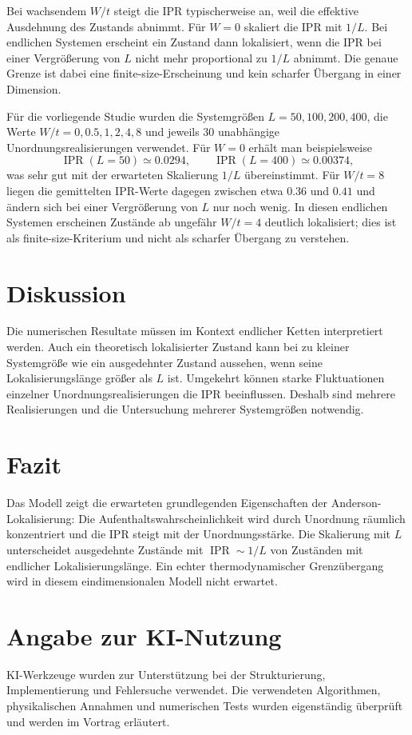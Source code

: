 \documentclass[11pt,a4paper]{article}
\begin{document}
Bei wachsendem $W/t$ steigt die IPR typischerweise an, weil die effektive
Ausdehnung des Zustands abnimmt. Für $W=0$ skaliert die IPR mit $1/L$.
Bei endlichen Systemen erscheint ein Zustand dann lokalisiert, wenn die IPR
bei einer Vergrößerung von $L$ nicht mehr proportional zu $1/L$ abnimmt.
Die genaue Grenze ist dabei eine finite-size-Erscheinung und kein scharfer
Übergang in einer Dimension.

Für die vorliegende Studie wurden die Systemgrößen $L=50,100,200,400$,
die Werte $W/t=0,0.5,1,2,4,8$ und jeweils 30 unabhängige
Unordnungsrealisierungen verwendet. Für $W=0$ erhält man beispielsweise
\[
 \operatorname{IPR}(L=50)\simeq 0.0294,\qquad
 \operatorname{IPR}(L=400)\simeq 0.00374,
\]
was sehr gut mit der erwarteten Skalierung $1/L$ übereinstimmt. Für $W/t=8$
liegen die gemittelten IPR-Werte dagegen zwischen etwa $0.36$ und $0.41$
und ändern sich bei einer Vergrößerung von $L$ nur noch wenig. In diesen
endlichen Systemen erscheinen Zustände ab ungefähr $W/t=4$ deutlich
lokalisiert; dies ist als finite-size-Kriterium und nicht als scharfer
Übergang zu verstehen.

\section{Diskussion}
Die numerischen Resultate müssen im Kontext endlicher Ketten interpretiert
werden. Auch ein theoretisch lokalisierter Zustand kann bei zu kleiner
Systemgröße wie ein ausgedehnter Zustand aussehen, wenn seine
Lokalisierungslänge größer als $L$ ist. Umgekehrt können starke
Fluktuationen einzelner Unordnungsrealisierungen die IPR beeinflussen.
Deshalb sind mehrere Realisierungen und die Untersuchung mehrerer
Systemgrößen notwendig.

\section{Fazit}
Das Modell zeigt die erwarteten grundlegenden Eigenschaften der
Anderson-Lokalisierung: Die Aufenthaltswahrscheinlichkeit wird durch
Unordnung räumlich konzentriert und die IPR steigt mit der
Unordnungsstärke. Die Skalierung mit $L$ unterscheidet ausgedehnte Zustände
mit $\operatorname{IPR}\sim 1/L$ von Zuständen mit endlicher
Lokalisierungslänge. Ein echter thermodynamischer Grenzübergang wird in
diesem eindimensionalen Modell nicht erwartet.

\section*{Angabe zur KI-Nutzung}
KI-Werkzeuge wurden zur Unterstützung bei der Strukturierung, Implementierung
und Fehlersuche verwendet. Die verwendeten Algorithmen, physikalischen
Annahmen und numerischen Tests wurden eigenständig überprüft und werden im
Vortrag erläutert.
\end{document}
